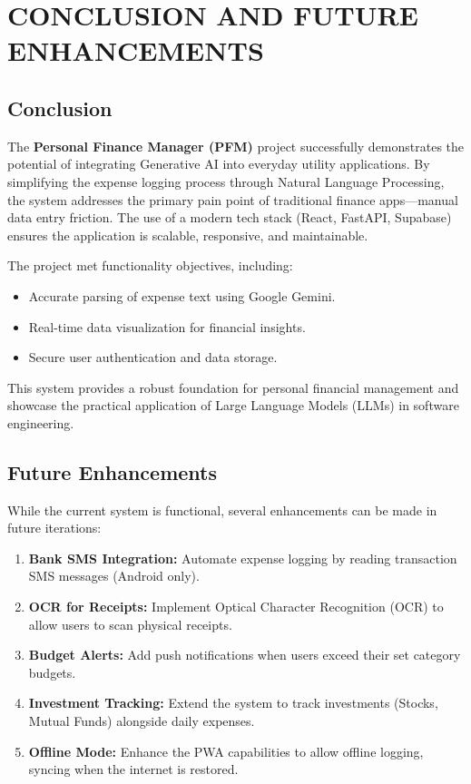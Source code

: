 \chapter{CONCLUSION AND FUTURE ENHANCEMENTS}

\section{Conclusion}
The \textbf{Personal Finance Manager (PFM)} project successfully demonstrates the potential of integrating Generative AI into everyday utility applications. By simplifying the expense logging process through Natural Language Processing, the system addresses the primary pain point of traditional finance apps---manual data entry friction. The use of a modern tech stack (React, FastAPI, Supabase) ensures the application is scalable, responsive, and maintainable.

The project met functionality objectives, including:
\begin{itemize}
    \item Accurate parsing of expense text using Google Gemini.
    \item Real-time data visualization for financial insights.
    \item Secure user authentication and data storage.
\end{itemize}

This system provides a robust foundation for personal financial management and showcase the practical application of Large Language Models (LLMs) in software engineering.

\section{Future Enhancements}
While the current system is functional, several enhancements can be made in future iterations:

\begin{enumerate}
    \item \textbf{Bank SMS Integration:} Automate expense logging by reading transaction SMS messages (Android only).
    \item \textbf{OCR for Receipts:} Implement Optical Character Recognition (OCR) to allow users to scan physical receipts.
    \item \textbf{Budget Alerts:} Add push notifications when users exceed their set category budgets.
    \item \textbf{Investment Tracking:} Extend the system to track investments (Stocks, Mutual Funds) alongside daily expenses.
    \item \textbf{Offline Mode:} Enhance the PWA capabilities to allow offline logging, syncing when the internet is restored.
\end{enumerate}

